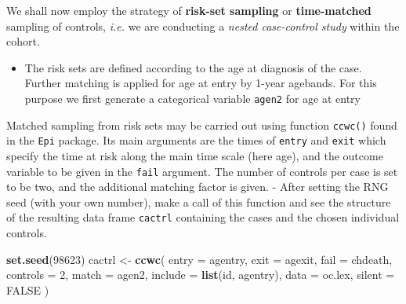 \documentclass[
]{book}
\newenvironment{Shaded}{\begin{snugshade}}{\end{snugshade}}
\newcommand{\AttributeTok}[1]{\textcolor[rgb]{0.13,0.29,0.53}{#1}}
\newcommand{\ConstantTok}[1]{\textcolor[rgb]{0.56,0.35,0.01}{#1}}
\newcommand{\DecValTok}[1]{\textcolor[rgb]{0.00,0.00,0.81}{#1}}
\newcommand{\FunctionTok}[1]{\textcolor[rgb]{0.13,0.29,0.53}{\textbf{#1}}}
\newcommand{\NormalTok}[1]{#1}
\newcommand{\OtherTok}[1]{\textcolor[rgb]{0.56,0.35,0.01}{#1}}
\newcommand{\SpecialCharTok}[1]{\textcolor[rgb]{0.81,0.36,0.00}{\textbf{#1}}}
\providecommand{\tightlist}{%
  \setlength{\itemsep}{0pt}\setlength{\parskip}{0pt}}
\begin{document}
We shall now employ the strategy of \textbf{risk-set sampling}
or \textbf{time-matched} sampling of controls, \emph{i.e.}
we are conducting a \emph{nested case-control study}
within the cohort.

\begin{itemize}
\tightlist
\item
  The risk sets are defined according to the age at diagnosis of the case. Further matching is applied for age at entry by 1-year agebands.
  For this purpose we first generate a categorical variable
  \texttt{agen2} for age at entry
\end{itemize}

\begin{Shaded}
\end{Shaded}

Matched sampling from risk sets may be carried out using
function \texttt{ccwc()} found in the \texttt{Epi} package.
Its main arguments are the times
of \texttt{entry} and \texttt{exit} which specify the time at risk along the
main time scale (here age), and the outcome variable to be given
in the \texttt{fail} argument. The number of controls per case
is set to be two, and the additional matching factor is given.
- After setting the RNG seed (with your own number),
make a call of this function and see
the structure of the resulting data frame \texttt{cactrl}
containing the cases and the chosen individual controls.

\begin{Shaded}
\begin{Highlighting}[]
\FunctionTok{set.seed}\NormalTok{(}\DecValTok{98623}\NormalTok{)}
\NormalTok{cactrl }\OtherTok{\textless{}{-}}
  \FunctionTok{ccwc}\NormalTok{(}
    \AttributeTok{entry =}\NormalTok{ agentry, }\AttributeTok{exit =}\NormalTok{ agexit, }\AttributeTok{fail =}\NormalTok{ chdeath,}
    \AttributeTok{controls =} \DecValTok{2}\NormalTok{, }\AttributeTok{match =}\NormalTok{ agen2,}
    \AttributeTok{include =} \FunctionTok{list}\NormalTok{(id, agentry),}
    \AttributeTok{data =}\NormalTok{ oc.lex, }\AttributeTok{silent =} \ConstantTok{FALSE}
\NormalTok{  )}
\end{Highlighting}
\end{Shaded}
\end{document}
